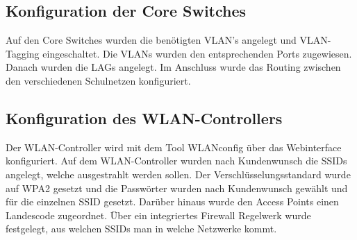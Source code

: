 \subsection{Konfiguration der Core Switches}
\label{sec:Konfiguration der Core Switches}
Auf den Core Switches wurden die benötigten VLAN's angelegt und VLAN-Tagging eingeschaltet. Die VLANs wurden den entsprechenden Ports zugewiesen. Danach wurden die \ac{LAG}s angelegt. Im Anschluss wurde das Routing zwischen den verschiedenen Schulnetzen konfiguriert.

\subsection{Konfiguration des WLAN-Controllers}
\label{sec:Konfiguration des WLAN-Controllers}
Der WLAN-Controller wird mit dem Tool WLANconfig über das Webinterface konfiguriert. Auf dem WLAN-Controller wurden nach Kundenwunsch die \ac{SSID}s angelegt, welche ausgestrahlt werden sollen. Der Verschlüsselungsstandard wurde auf WPA2 gesetzt und die Passwörter wurden nach Kundenwunsch gewählt und für die einzelnen \ac{SSID} gesetzt. Darüber hinaus wurde den Access Points einen Landescode zugeordnet. Über ein integriertes Firewall Regelwerk wurde festgelegt, aus welchen \ac{SSID}s man in welche Netzwerke kommt.






